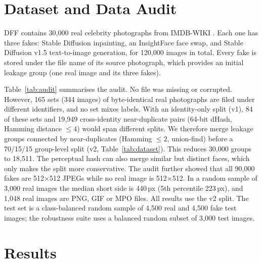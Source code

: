 \documentclass[conference]{IEEEtran}
\begin{document}
\section{Dataset and Data Audit}\label{sec:data}
DFF \cite{song2023dff} contains 30{,}000 real celebrity photographs from IMDB-WIKI \cite{rothe2018imdbwiki}. Each one has three fakes: Stable Diffusion inpainting, an InsightFace \cite{deng2019arcface} face swap, and Stable Diffusion v1.5 \cite{rombach2022ldm} text-to-image generation, for 120{,}000 images in total. Every fake is stored under the file name of its source photograph, which provides an initial leakage group (one real image and its three fakes).

Table~\ref{tab:audit} summarises the audit. No file was missing or corrupted. However, 165 sets (344 images) of byte-identical real photographs are filed under different identifiers, and no set mixes labels. With an identity-only split (v1), 84 of these sets and 19{,}949 cross-identity near-duplicate pairs (64-bit dHash, Hamming distance $\le4$) would span different splits. We therefore merge leakage groups connected by near-duplicates (Hamming $\le2$, union-find) before a 70/15/15 group-level split (v2, Table~\ref{tab:dataset}). This reduces 30{,}000 groups to 18{,}511. The perceptual hash can also merge similar but distinct faces, which only makes the split more conservative. The audit further showed that all 90{,}000 fakes are 512$\times$512 JPEGs while no real image is 512$\times$512. In a random sample of 3{,}000 real images the median short side is 440\,px (5th percentile 223\,px), and 1{,}048 real images are PNG, GIF or MPO files. All results use the v2 split. The test set is a class-balanced random sample of 4{,}500 real and 4{,}500 fake test images; the robustness suite uses a balanced random subset of 3{,}000 test images.




\section{Results}\label{sec:results}
\end{document}
